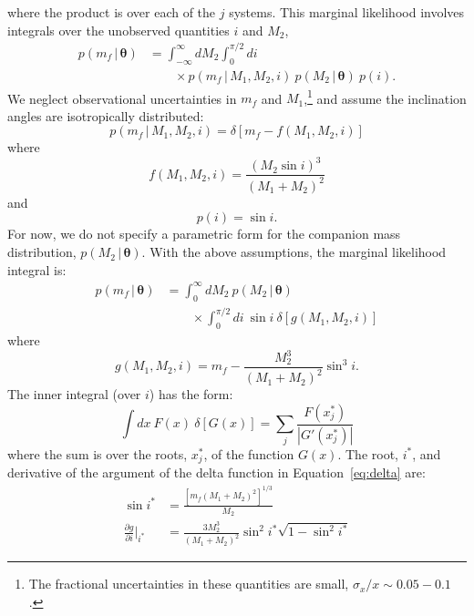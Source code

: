 \documentclass[apjl]{emulateapj}
\newcommand{\given}{\,|\,}
\newcommand{\bs}[1]{\boldsymbol{#1}}
\newcommand{\eqn}{Equation~}
\newcommand{\mf}{m_f}
\begin{document}
where the product is over each of the $j$ systems.  This marginal likelihood involves integrals over the unobserved quantities $i$ and $M_2$,
\begin{align}
    p(\mf \given \bs{\theta}) &= \int_{-\infty}^\infty dM_2 \int_0^{\pi/2} di  \nonumber \\
      & \qquad {} \times p(\mf \given M_1, M_2, i)~p(M_2 \given \bs{\theta})~p(i).
\end{align}
We neglect observational uncertainties in $\mf$ and $M_1$,\footnote{The fractional uncertainties in these quantities are small, $\sigma_x / x \sim 0.05-0.1$ \citep{gianninas14}.} and assume the inclination angles are isotropically distributed:
\begin{equation}
	p(\mf \given M_1, M_2, i) = \delta \left[\mf - f(M_1, M_2, i) \right]
\end{equation}
where
\begin{equation}
	f(M_1, M_2, i) = \frac{(M_2 \sin i)^3}{(M_1 + M_2)^2}
\end{equation}
and
\begin{equation}
	p(i) = \sin i.
\end{equation}
For now, we do not specify a parametric form for the companion mass distribution, $p(M_2 \given \bs{\theta})$. With the above assumptions, the marginal likelihood integral is:
\begin{align}
    p(\mf \given \bs{\theta}) &= \int_{0}^\infty dM_2 ~p(M_2 \given \bs{\theta})  \nonumber \\
    & \qquad {} \times \int_0^{\pi/2} di ~\sin i ~ \delta \left[g(M_1,M_2,i) \right]\label{eq:delta}
\end{align}
where
\begin{equation}
	g(M_1,M_2,i) = \mf - \frac{M_2^3}{(M_1+M_2)^2}\sin^3 i.
\end{equation}
The inner integral (over $i$) has the form:
\begin{equation}
    \int dx~F(x)~\delta \left[ G(x) \right] = \sum_j \frac{F(x^*_j)}{|G'(x^*_j)|}
\end{equation}
where the sum is over the roots, $x^*_j$, of the function $G(x)$. The root, $i^*$, and derivative of the argument of the delta function in \eqn\ref{eq:delta} are: 
\begin{align}
	\sin i^* &= \frac{ \left[\mf(M_1+M_2)^2 \right]^{1/3}}{M_2}\\
	\frac{\partial g}{\partial i}\bigg\rvert_{i^*} &= \frac{3M_2^3}{(M_1+M_2)^2} \sin^2 i^* \sqrt{1 - \sin^2 i^*}
\end{align}
\end{document}
